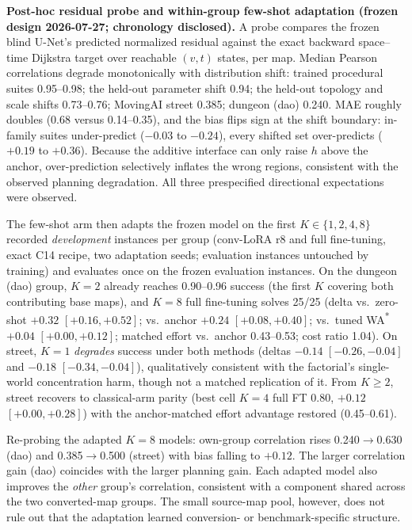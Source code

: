 \documentclass[letterpaper]{article} %
\begin{document}
\textbf{Post-hoc residual probe and within-group few-shot adaptation (frozen design 2026-07-27; chronology disclosed).} A probe compares the frozen blind U-Net's predicted normalized residual against the exact backward space--time Dijkstra target over reachable $(v,t)$ states, per map. Median Pearson correlations degrade monotonically with distribution shift: trained procedural suites 0.95--0.98; the held-out parameter shift 0.94; the held-out topology and scale shifts 0.73--0.76; MovingAI street 0.385; dungeon (dao) 0.240. MAE roughly doubles (0.68 versus 0.14--0.35), and the bias flips sign at the shift boundary: in-family suites under-predict ($-0.03$ to $-0.24$), every shifted set over-predicts ($+0.19$ to $+0.36$). Because the additive interface can only raise $h$ above the anchor, over-prediction selectively inflates the wrong regions, consistent with the observed planning degradation. All three prespecified directional expectations were observed.

The few-shot arm then adapts the frozen model on the first $K \in \{1,2,4,8\}$ recorded \emph{development} instances per group (conv-LoRA r8 and full fine-tuning, exact C14 recipe, two adaptation seeds; evaluation instances untouched by training) and evaluates once on the frozen evaluation instances. On the dungeon (dao) group, $K{=}2$ already reaches 0.90--0.96 success (the first $K$ covering both contributing base maps), and $K{=}8$ full fine-tuning solves 25/25 (delta vs.\ zero-shot $+0.32$ $[+0.16,+0.52]$; vs.\ anchor $+0.24$ $[+0.08,+0.40]$; vs.\ tuned WA\textsuperscript{*} $+0.04$ $[+0.00,+0.12]$; matched effort vs.\ anchor 0.43--0.53; cost ratio 1.04). On street, $K{=}1$ \emph{degrades} success under both methods (deltas $-0.14$ $[-0.26,-0.04]$ and $-0.18$ $[-0.34,-0.04]$), qualitatively consistent with the factorial's single-world concentration harm, though not a matched replication of it. From $K \geq 2$, street recovers to classical-arm parity (best cell $K{=}4$ full FT 0.80, $+0.12$ $[+0.00,+0.28]$) with the anchor-matched effort advantage restored (0.45--0.61).

Re-probing the adapted $K{=}8$ models: own-group correlation rises 0.240$\to$0.630 (dao) and 0.385$\to$0.500 (street) with bias falling to $+0.12$. The larger correlation gain (dao) coincides with the larger planning gain. Each adapted model also improves the \emph{other} group's correlation, consistent with a component shared across the two converted-map groups. The small source-map pool, however, does not rule out that the adaptation learned conversion- or benchmark-specific structure.
\end{document}
